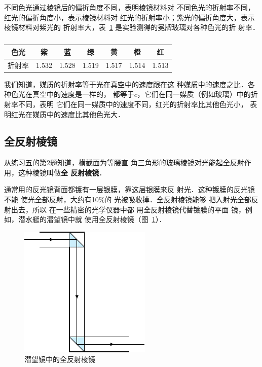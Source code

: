     不同色光通过棱镜后的偏折角度不同，表明棱镜材料对
    不同色光的折射率不同，红光的偏折角度小，表示棱镜材料对
    红光的折射率小；紫光的偏折角度大，表示棱镜材料对紫光的
    折射率大，表~\ref{tab_C_5-3} 是实验测得的冕牌玻璃对各种色光的折
    射率．

\begin{table}[htbp]
	\centering
	\caption{}\label{tab_C_5-3}
    \begin{tabular}{ccccccc}
        \toprule
        色光&        紫&        蓝&        绿&        黄&        橙&        红\\
        \midrule
        折射率&        1.532&        1.528&        1.519&        1.517&        1.514&        1.513\\
        \bottomrule
    \end{tabular}
\end{table}

我们知道，媒质的折射率等于光在真空中的速度跟在这
种媒质中的速度之比．各种色光在真空中的速度是一样的，
都等于$c$，它们在同一媒质（例如玻璃）中的折射率不同，表明
它们在同一媒质中的速度不同，红光的折射率比其他色光小，
表明红光在媒质中的速度比其他色光大．

\subsection{全反射棱镜}

从练习五的第2题知道，横截面为等腰直
角三角形的玻璃棱镜对光能起全反射作用，这种棱镜叫做\textbf{全
反射棱镜}．

通常用的反光镜背面都镀有一层银膜，靠这层银膜来反
射光．这种镀膜的反光镜不能
使光全部反射，大约有10\%的
光被吸收掉．全反射棱镜能够
把入射光全部反射出去，所以
在一些精密的光学仪器中都
用全反射棱镜代替镀膜的平面
镜，例如，潜水艇的潜望镜中就
使用全反射棱镜（图~\ref{fig_C_5-33}）．
\begin{figure}[htbp]
    \centering
    \includegraphics{fig/C/5-33.pdf}
    \caption{潜望镜中的全反射棱镜}\label{fig_C_5-33}
\end{figure}


